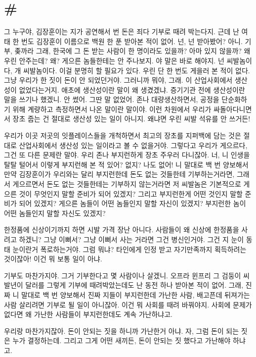 \documentclass[a5paper,10pt, twoside, openright]{memoir}
\begin{document}
	\section{\#}
	그 누구야, 김장훈이는 지가 공연해서 번 돈은 죄다 기부로 때려 박는다지. 근데 난 여태 한 번도 김장훈이 이름으로 백원 한 푼 받아본 적이 없어. 넌, 넌 받아봤어? 아니. 기부, 좆까라 그래, 한국에 그 돈 받는 사람이 한 명이라도 있을까? 아마 있지 않을까? 왜 우린 안주는데? 왜? 게으른 놈들한테는 안 주나보지. 야 말은 바로 해야지. 넌 씨발놈이다, 개 씨발놈이다. 이걸 분명히 할 필요가 있다. 우린 단 한 번도 게을러 본 적이 없다. 그냥 우리가 한 짓이 돈이 안 되었던거야. 그러니까 뭐야, 그래. 이 산업사회에서 생산성이 없었다는거지. 애초에 생산성이란 말이 왜 생겼겠냐. 증기기관 전에 생산성이란 말을 쓰기나 했겠니. 안 썼어. 그딴 말 없었어. 존나 대량생산하면서, 공정을 단순화하기 위해 계량하고 측정하면서 나온 말이란 말이야. 이런 차원에서 우리가 싸돌아다니면서 장초 줍는 건 절대로 생산성 있는 일이 아니지. 왜냐면 우린 씨발 석유를 안 쓰거든! 

	우리가 이곳 저곳의 잇플레이스들을 개척하면서 최고의 장초를 지퍼백에 담는 것은 절대로 산업사회에서 생산성 있는 일이라고 볼 수 없을거야. 그렇다고 우리가 게으르다, 그건 또 다른 문제란 말야. 우리 존나 부지런하게 장초 주우러 다니잖아. 너, 니 인생을 탈탈 털어서 이렇게 부지런해 본 적 있어? 없지? 나도 없어! 니 말대로 백 번 양보해서 만약 김장훈이가 우리와는 달리 부지런한데 돈도 없는 것들한테 기부하는거라면, 그래서 게으르면서 돈도 없는 것들한테는 기부하지 않는거라면 저 씨발놈은 기본적으로 게으른 것이 무엇인지 말할 준비가 되어 있겠지? 그리고 부지런한게 어떤 것인지 말할 준비가 되어 있겠지? 게으른 놈들이 어떤 놈들인지 말할 자신이 있겠지? 부지런한 놈이 어떤 놈들인지 말할 자신도 있겠지?

	한정품에 신상이기까지 하면 시발 가격 장난 아니다. 사람들이 왜 신상에 한정품을 사려고 하겠니? 그냥 이뻐서? 그냥 이뻐서 사는 거라면 그건 병신인거야. 그건 지 눈이 동태 눈이란거 폭로하는거야. 그럼 뭐냐? 타인에게 인정 받고 자기만족까지 획득하려는 것이잖아! 이건 뭐 보통 일이 아냐. 

	기부도 마찬가지야. 그거 기부한다고 몇 사람이나 살겠니. 오프라 윈프리 그 검둥이 씨발년이 달러를 그렇게 기부에 때려박았는데도 난 동전 하나 받아본 적이 없어. 그래, 진짜 니 말대로 백 번 양보해서 진짜 지들이 부지런한데 가난한 사람, 배고픈데 뒤져가는 사람 살리려면 기부로 될 일이 아니잖아. 이건 뭐 사회를 때려 바꿔야지. 사회에 문제가 없다면 왜 가난한 사람들이 부지런한데도 계속 가난하냐고. 

	우리랑 마찬가지잖아. 돈이 안되는 짓을 하니까 가난한거 아냐. 자, 그럼 돈이 되는 짓은 누가 결정하는데. 그리고 그게 어떤 새끼든, 돈이 안되는 짓 했다고 가난해야 하냐고. 
\end{document}
